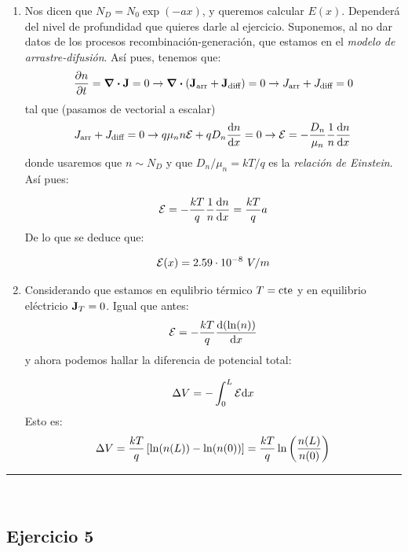 \begin{enumerate}[label=\alph*)]
	\item Nos dicen que $N_D=N_0 \exp(-ax)$, y queremos calcular $E(x)$. Dependerá del nivel de profundidad que quieres darle al ejercicio. Suponemos, al no dar datos de los procesos recombinación-generación, que estamos en el \textit{modelo de arrastre-difusión}. Así pues, tenemos que:
	\begin{equation}
		\frac{\partial n}{\partial t} = \div \mathbf{J} = 0 \rightarrow \div (\mathbf{J}_{\text{arr}}+\mathbf{J}_{\text{diff}}) = 0 \rightarrow J_{\text{arr}}+J_{\text{diff}} = 0
	\end{equation}
	tal que (pasamos de vectorial a escalar)
	\begin{equation}
		J_{\text{arr}}+J_{\text{diff}} = 0 \rightarrow q \mu_n n \mathcal{E} + q D_n \frac{\mathrm{d} n}{\mathrm{d} x} = 0 \rightarrow \mathcal{E} = - \frac{D_n}{\mu_n} \frac{1}{n} \frac{\mathrm{d} n}{\mathrm{d} x}
	\end{equation}
	donde usaremos que $n\sim N_D$ y que $D_n / \mu_n = kT/q$ es la \textit{relación de Einstein}. Así pues:

	\begin{equation}
		\mathcal{E} = - \frac{kT}{q} \frac{1}{n} \frac{\mathrm{d} n}{\mathrm{d} x} = \frac{kT}{q} a
	\end{equation}
	De lo que se deduce que:

	\begin{equation}
		\Ecal(x) = 2.59 \cdot 10^{-8} \ V/m
	\end{equation}
	\item Considerando que estamos en equlibrio térmico $T=\text{cte}$ y en equilibrio eléctricio $\mathbf{J}_T=0$. Igual que antes:
	\begin{equation}
		\mathcal{E} = - \frac{kT}{q} \frac{\mathrm{d} (\ln(n))}{\mathrm{d} x}
	\end{equation}
	y ahora podemos hallar la diferencia de potencial total:

	\begin{equation}
		\Delta V = - \int_{0}^L \mathcal{E} \mathrm{d} x
	\end{equation}
	Esto es:
	\begin{equation}
		\Delta V = \frac{kT}{q} \left[ \ln(n(L))-\ln(n(0)) \right] = \frac{kT}{q} \ln\left( \frac{n(L)}{n(0)} \right) 
	\end{equation}
\end{enumerate}


\rule{\textwidth}{0.1pt} \\[2pt]
\subsection{Ejercicio 5}

